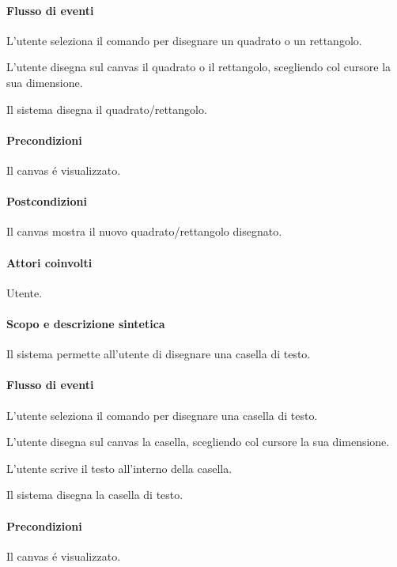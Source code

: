 \paragraph{Flusso di eventi}
\begin{elenconumerato}[\textbf{}]{\subsubsecindent}
\item L'utente seleziona il comando per disegnare un quadrato o un rettangolo.
\item L'utente disegna sul canvas il quadrato o il rettangolo, scegliendo col cursore la sua dimensione.
\item Il sistema disegna il quadrato/rettangolo.
\end{elenconumerato}
\paragraph{Precondizioni} Il canvas \'e visualizzato.
\paragraph{Postcondizioni} Il canvas mostra il nuovo quadrato/rettangolo disegnato.

\paragraph{Attori coinvolti} Utente.
\paragraph{Scopo e descrizione sintetica} 
Il sistema permette all'utente di disegnare una casella di testo.
\paragraph{Flusso di eventi}
\begin{elenconumerato}[\textbf{}]{\subsubsecindent}
\item L'utente seleziona il comando per disegnare una casella di testo.
\item L'utente disegna sul canvas la casella, scegliendo col cursore la sua dimensione.
\item L'utente scrive il testo all'interno della casella.
\item Il sistema disegna la casella di testo.
\end{elenconumerato}
\paragraph{Precondizioni} Il canvas \'e visualizzato.
